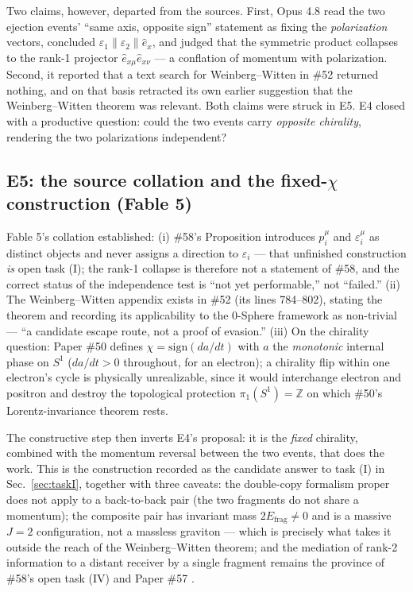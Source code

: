 \documentclass[%
 reprint, amsmath,amssymb, aps, prb, ]{revtex4-2}
\numberwithin{equation}{section}
\begin{document}
Two claims, however, departed from the sources. First, Opus 4.8 read the two ejection events' ``same axis, opposite sign'' statement as fixing the \emph{polarization} vectors, concluded $\varepsilon_1\parallel\varepsilon_2\parallel\hat e_x$, and judged that the symmetric product collapses to the rank-1 projector $\hat e_{x\mu}\hat e_{x\nu}$ --- a conflation of momentum with polarization. Second, it reported that a text search for Weinberg--Witten in \#52 returned nothing, and on that basis retracted its own earlier suggestion that the Weinberg--Witten theorem \cite{ww} was relevant. Both claims were struck in E5. E4 closed with a productive question: could the two events carry \emph{opposite chirality}, rendering the two polarizations independent?

\subsection{E5: the source collation and the fixed-$\chi$ construction (Fable 5)}

Fable 5's collation established: (i) \#58's Proposition introduces $p_i^\mu$ and $\varepsilon_i^\mu$ as distinct objects and never assigns a direction to $\varepsilon_i$ --- that unfinished construction \emph{is} open task (I); the rank-1 collapse is therefore not a statement of \#58, and the correct status of the independence test is ``not yet performable,'' not ``failed.'' (ii) The Weinberg--Witten appendix exists in \#52 (its lines 784--802), stating the theorem and recording its applicability to the 0-Sphere framework as non-trivial --- ``a candidate escape route, not a proof of evasion.'' (iii) On the chirality question: Paper \#50 \cite{hanamura50} defines $\chi=\mathrm{sign}(da/dt)$ with $a$ the \emph{monotonic} internal phase on $S^1$ ($da/dt>0$ throughout, for an electron); a chirality flip within one electron's cycle is physically unrealizable, since it would interchange electron and positron and destroy the topological protection $\pi_1(S^1)=\mathbb{Z}$ on which \#50's Lorentz-invariance theorem rests.

The constructive step then inverts E4's proposal: it is the \emph{fixed} chirality, combined with the momentum reversal between the two events, that does the work. This is the construction recorded as the candidate answer to task (I) in Sec.~\ref{sec:taskI}, together with three caveats: the double-copy formalism proper does not apply to a back-to-back pair (the two fragments do not share a momentum); the composite pair has invariant mass $2E_{\mathrm{frag}}\neq0$ and is a massive $J=2$ configuration, not a massless graviton --- which is precisely what takes it outside the reach of the Weinberg--Witten theorem; and the mediation of rank-2 information to a distant receiver by a single fragment remains the province of \#58's open task (IV) and Paper \#57 \cite{hanamura57}.
\end{document}
